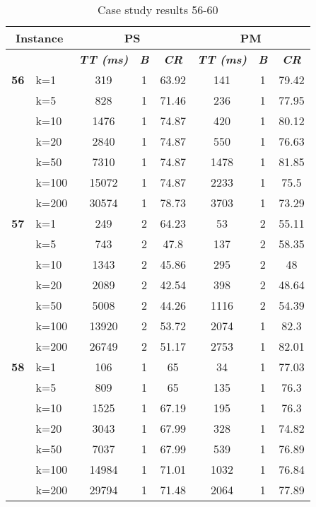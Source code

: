     \begin{table}[htbp]
    \caption{Case study results 56-60}
    \centering
    \begin{tabular}{|l|l|c|c|c|c|c|c|}
    \hline
    \multicolumn{ 2}{|c|}{\textbf{Instance}} & \multicolumn{ 3}{c|}{\textbf{PS}} & \multicolumn{ 3}{c|}{\textbf{PM}} \\ \hline
    \multicolumn{ 2}{|l|}{} & \textbf{\textit{TT (ms)}} & \textbf{\textit{B}} & \textbf{\textit{CR}} & \textbf{\textit{TT (ms)}} & \textbf{\textit{B}} & \textbf{\textit{CR}} \\ \hline
    \multicolumn{1}{|r|}{\textbf{56}} & k=1 & 319 & 1 & 63.92 & 141 & 1 & 79.42 \\ 
     & k=5 & 828 & 1 & 71.46 & 236 & 1 & 77.95 \\ 
     & k=10 & 1476 & 1 & 74.87 & 420 & 1 & 80.12 \\ 
     & k=20 & 2840 & 1 & 74.87 & 550 & 1 & 76.63 \\ 
     & k=50 & 7310 & 1 & 74.87 & 1478 & 1 & 81.85 \\ 
     & k=100 & 15072 & 1 & 74.87 & 2233 & 1 & 75.5 \\ 
     & k=200 & 30574 & 1 & 78.73 & 3703 & 1 & 73.29 \\ \hline
    \multicolumn{1}{|r|}{\textbf{57}} & k=1 & 249 & 2 & 64.23 & 53 & 2 & 55.11 \\ 
     & k=5 & 743 & 2 & 47.8 & 137 & 2 & 58.35 \\ 
     & k=10 & 1343 & 2 & 45.86 & 295 & 2 & 48 \\ 
     & k=20 & 2089 & 2 & 42.54 & 398 & 2 & 48.64 \\ 
     & k=50 & 5008 & 2 & 44.26 & 1116 & 2 & 54.39 \\ 
     & k=100 & 13920 & 2 & 53.72 & 2074 & 1 & 82.3 \\ 
     & k=200 & 26749 & 2 & 51.17 & 2753 & 1 & 82.01 \\ \hline
    \multicolumn{1}{|r|}{\textbf{58}} & k=1 & 106 & 1 & 65 & 34 & 1 & 77.03 \\ 
     & k=5 & 809 & 1 & 65 & 135 & 1 & 76.3 \\ 
     & k=10 & 1525 & 1 & 67.19 & 195 & 1 & 76.3 \\ 
     & k=20 & 3043 & 1 & 67.99 & 328 & 1 & 74.82 \\ 
     & k=50 & 7037 & 1 & 67.99 & 539 & 1 & 76.89 \\ 
     & k=100 & 14984 & 1 & 71.01 & 1032 & 1 & 76.84 \\ 
     & k=200 & 29794 & 1 & 71.48 & 2064 & 1 & 77.89 \\ \hline

\end{tabular}
\end{table}
